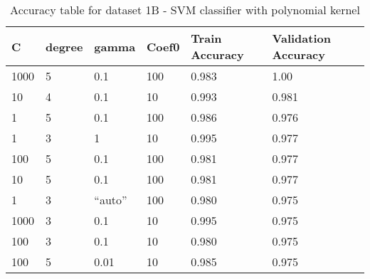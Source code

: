 \def\arraystretch{1.25}
\begin{table}[H]
\centering
\begin{tabular}{l l l l l l}
\hline
\hline
\textbf{C} & \textbf{degree} & \textbf{gamma} & \textbf{Coef0} & \textbf{Train Accuracy} & \textbf{Validation Accuracy}\\
\hline
\hline
1000 & 5 & 0.1 & 100 & 0.983 & 1.00 \\
10 & 4 & 0.1 & 10 & 0.993 & 0.981 \\
1 & 5 & 0.1 & 100 & 0.986 & 0.976  \\
1 & 3 & 1 & 10 & 0.995 & 0.977 \\
100 & 5 & 0.1 & 100 & 0.981 & 0.977 \\
10 & 5 & 0.1 & 100 & 0.981 & 0.977 \\
1 & 3 & ``auto'' & 100 & 0.980 & 0.975 \\
1000 & 3 & 0.1 & 10 & 0.995 & 0.975 \\
100 & 3 & 0.1 & 10 & 0.980 & 0.975 \\
100 & 5 & 0.01 & 10 & 0.985 & 0.975 \\

\hline
\end{tabular}
\caption{Accuracy table for dataset 1B - SVM classifier with polynomial kernel}
\end{table}